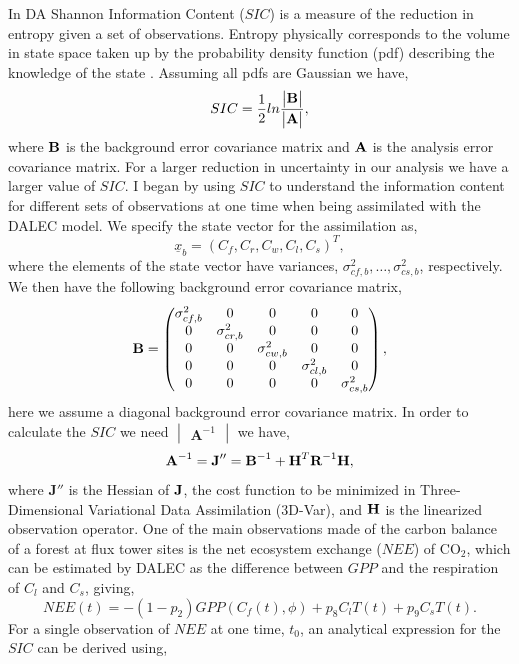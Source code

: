 \documentclass[11pt]{article}
\begin{document}
In DA Shannon Information Content ($SIC$) is a measure of the reduction in entropy given a set of observations. Entropy physically corresponds to the volume in state space taken up by the probability density function (pdf) describing the knowledge of the state \cite{rodgers2000inverse}. Assuming all pdfs are Gaussian we have,
\[
SIC=\frac{1}{2}ln\frac{\begin{vmatrix} \bf{B} \end{vmatrix}}{\begin{vmatrix} \bf{A} \end{vmatrix}},
\]
where $\bf{B}$ is the background error covariance matrix and $\bf{A}$ is the analysis error covariance matrix. For a larger reduction in uncertainty in our analysis we have a larger value of $SIC$. I began by using $SIC$ to understand the information content for different sets of observations at one time when being assimilated with the DALEC model. We specify the state vector for the assimilation as,
\[ \underline{x}_b = (C_f, C_r, C_w, C_l, C_s)^T, \] 
where the elements of the state vector have variances, $\sigma_{cf,b}^{2},\ldots,\sigma_{cs,b}^{2}$, respectively. We then have the following background error covariance matrix,
\[
\bf{B} = \begin{pmatrix} 
\sigma_{cf,b}^{2} & 0 & 0 & 0 & 0 \\
0 & \sigma_{cr,b}^{2} & 0 & 0 & 0 \\
0 & 0 & \sigma_{cw,b}^{2} & 0 & 0 \\
0 & 0 & 0 & \sigma_{cl,b}^{2} & 0 \\
0 & 0 & 0 & 0 & \sigma_{cs,b}^{2} \\
\end{pmatrix},
\]  
here we assume a diagonal background error covariance matrix. In order to calculate the $SIC$ we need $\begin{vmatrix} \textbf{A}^{-1} \end{vmatrix}$ we have,
\[
\textbf{A}^{-1}=\textbf{J}'' = \textbf{B}^{-1}+\textbf{H}^{T}\textbf{R}^{-1}\bf{H}, 
\]
where $\textbf{J}''$ is the Hessian of $\bf{J}$, the cost function to be minimized in Three-Dimensional Variational Data Assimilation (3D-Var), and $\bf{H}$ is the linearized observation operator. One of the main observations made of the carbon balance of a forest at flux tower sites is the net ecosystem exchange ($NEE$) of CO$_{2}$, which can be estimated by DALEC as the difference between $GPP$ and the respiration of $C_l$ and $C_s$, giving,
\[ 
NEE(t)=-(1-p_2)GPP(C_f(t),\phi)+p_8C_lT(t)+p_9C_sT(t). 
\]
For a single observation of $NEE$ at one time, $t_0$, an analytical expression for the $SIC$ can be derived using,
\end{document}
